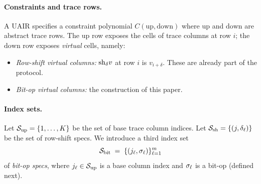 \paragraph{Constraints and trace rows.} A UAIR specifies a constraint
polynomial $C(\mathrm{up}, \mathrm{down})$ where $\mathrm{up}$ and
$\mathrm{down}$ are abstract trace rows. The $\mathrm{up}$ row exposes
the cells of trace columns at row $i$; the $\mathrm{down}$ row exposes
\emph{virtual} cells, namely:
\begin{itemize}[leftmargin=2em]
  \item \emph{Row-shift virtual columns:} $\mathrm{sh}_{\delta} v$ at row
    $i$ is $v_{i+\delta}$. These are already part of the protocol.
  \item \emph{Bit-op virtual columns:} the construction of this paper.
\end{itemize}

\paragraph{Index sets.} Let
$\mathcal{S}_{\mathrm{up}} = \{1,\ldots,K\}$ be the set of base trace column indices.
Let $\mathcal{S}_{\mathrm{sh}} = \{(j,\delta_\ell)\}$ be the set of row-shift specs. We
introduce a third index set
\[
  \mathcal{S}_{\mathrm{bit}} \;=\; \{ (j_\ell,\sigma_\ell) \}_{\ell=1}^{m}
\]
of \emph{bit-op specs}, where $j_\ell \in \mathcal{S}_{\mathrm{up}}$ is a base column index
and $\sigma_\ell$ is a bit-op (defined next).
